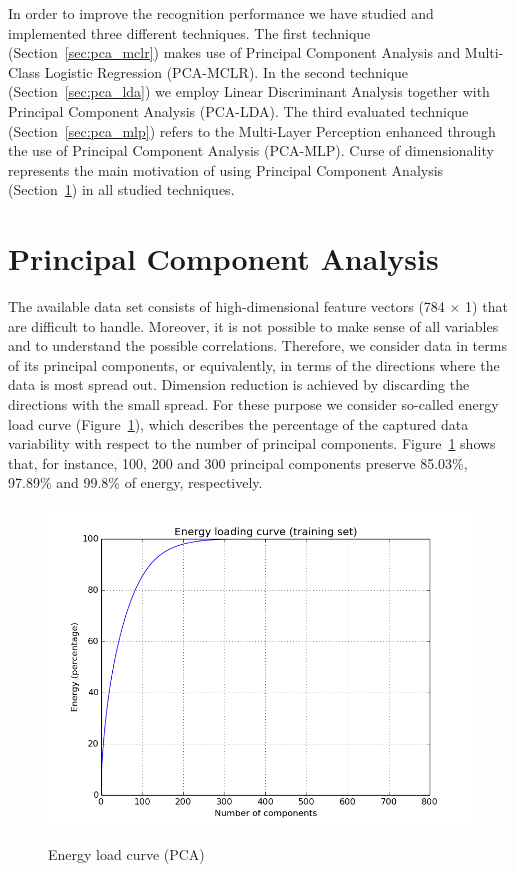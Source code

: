 \documentclass[a4paper,10pt,fleqn]{article}
\begin{document}
In order to improve the recognition performance we have studied and implemented three different techniques.
The first technique (Section~\ref{sec:pca_mclr})  makes use of Principal Component Analysis and Multi-Class Logistic Regression (PCA-MCLR).
In the second technique  (Section~\ref{sec:pca_lda}) we employ  Linear Discriminant Analysis together with Principal Component Analysis (PCA-LDA).
The third evaluated technique  (Section~\ref{sec:pca_mlp}) refers to the Multi-Layer Perception enhanced through the use of Principal Component Analysis (PCA-MLP). 
Curse of dimensionality represents the main motivation of using Principal Component Analysis (Section~\ref{sec:pca}) in all studied techniques.

\section{Principal Component Analysis}\label{sec:pca}

The available data set consists of high-dimensional feature vectors (784 $\times$ 1) that are difficult to handle. Moreover, it is not possible to make sense of all variables and to understand the possible correlations.
Therefore, we consider data  in terms of its principal components, or equivalently, in terms of the directions where the data is most spread out. Dimension reduction is achieved by discarding the directions with the small spread.
For these purpose we consider so-called energy load curve (Figure~\ref{fig:pca}), which describes the percentage of the captured data variability with respect to the number of principal components.
Figure~\ref{fig:pca} shows that, for instance, 100, 200 and 300 principal components preserve 85.03\%, 97.89\% and 99.8\% of energy, respectively.

\begin{figure}[htbf]
  \caption{Energy load curve (PCA)}
  \centering \includegraphics[width=\textwidth,height=0.7\textwidth]{Figures/energy_load_curve}
  \label{fig:pca}
\end{figure}
\end{document}
